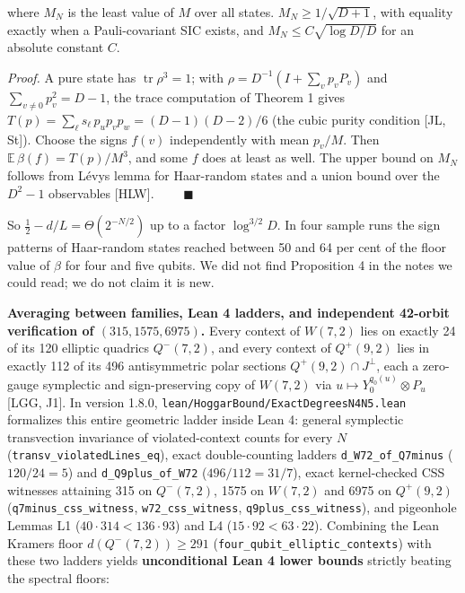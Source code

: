 \documentclass[11pt,a4paper]{article}
\newcommand{\lt}{<}
\begin{document}
where \(M_N\) is the least value of \(M\) over all states. \(M_N \ge 1/\sqrt{D+1}\), with equality exactly when a
Pauli-covariant SIC exists, and \(M_N \le C\sqrt{\log D / D}\) for an absolute constant \(C\).

\emph{Proof.} A pure state has \(\operatorname{tr}\rho^3 = 1\); with \(\rho = D^{-1}(I + \sum_v p_v P_v)\) and
\(\sum_{v\ne 0} p_v^2 = D-1\), the trace computation of Theorem 1 gives
\(T(p) = \sum_\ell s_\ell\, p_u p_v p_w = (D-1)(D-2)/6\) (the cubic purity condition {[}JL, St{]}). Choose the
signs \(f(v)\) independently with mean \(p_v/M\). Then \(\mathbb{E}\,\beta(f) = T(p)/M^3\), and some \(f\) does at
least as well. The upper bound on \(M_N\) follows from Lévy\textquotesingle s lemma for Haar-random states and a union
bound over the \(D^2-1\) observables {[}HLW{]}. \(\qquad\blacksquare\)

So \(\tfrac12 - d/L = \Theta(2^{-N/2})\) up to a factor \(\log^{3/2} D\). In four sample runs the sign patterns
of Haar-random states reached between 50 and 64 per cent of the floor value of \(\beta\) for four and five qubits.
We did not find Proposition 4 in the notes we could read; we do not claim it is new.

\textbf{Averaging between families, Lean 4 ladders, and independent 42-orbit verification of \((315, 1575, 6975)\).}
Every context of \(W(7,2)\) lies on exactly 24 of its 120 elliptic quadrics \(Q^-(7,2)\), and every context
of \(Q^+(9,2)\) lies in exactly 112 of its 496 antisymmetric polar sections \(Q^+(9,2) \cap J^\perp\), each
a zero-gauge symplectic and sign-preserving copy of \(W(7,2)\) via \(u \mapsto Y_0^{q_0(u)} \otimes P_u\)
{[}LGG, J1{]}. In version 1.8.0, \nolinkurl{lean/HoggarBound/ExactDegreesN4N5.lean} formalizes this entire geometric
ladder inside Lean 4: general symplectic transvection invariance of violated-context counts for every \(N\)
(\nolinkurl{transv_violatedLines_eq}), exact double-counting ladders \texttt{d\_W72\_of\_Q7minus} (\(120/24 = 5\)) and
\texttt{d\_Q9plus\_of\_W72} (\(496/112 = 31/7\)), exact kernel-checked CSS witnesses attaining 315 on \(Q^-(7,2)\),
1575 on \(W(7,2)\) and 6975 on \(Q^+(9,2)\) (\nolinkurl{q7minus_css_witness}, \texttt{w72\_css\_witness}, \nolinkurl{q9plus_css_witness}),
and pigeonhole Lemmas L1 (\(40 \cdot 314 \lt 136 \cdot 93\)) and L4 (\(15 \cdot 92 \lt 63 \cdot 22\)). Combining
the Lean Kramers floor \(d(Q^-(7,2)) \ge 291\) (\nolinkurl{four_qubit_elliptic_contexts}) with these two ladders
yields \textbf{unconditional Lean 4 lower bounds} strictly beating the spectral floors:
\end{document}
